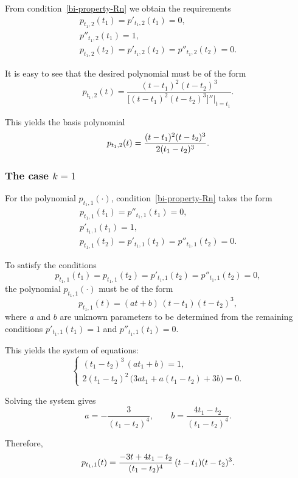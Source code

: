 \documentclass{article}
\theoremstyle{definition}
\theoremstyle{definition}
\numberwithin{figure}{section}
\newcommand{\1}{\mathbf{1}}
\begin{document}
From condition~\eqref{bi-property-Rn} we obtain the requirements
\begin{align*}
    p_{t_1,2}(t_1) = p'_{t_1,2}(t_1) = 0,\\
    p''_{t_1,2}(t_1) = 1,\\
    p_{t_1,2}(t_2) = p'_{t_1,2}(t_2) = p''_{t_1,2}(t_2) = 0.
\end{align*}

It is easy to see that the desired polynomial must be of the form
\[
    p_{t_1,2}(t)
    =
    \frac{(t - t_1)^2 (t - t_2)^3}{\bigl[(t - t_1)^2 (t - t_2)^3\bigr]''\big|_{t = t_1}}.
\]

This yields the basis polynomial
\begin{equation}\label{p_{t_1,2}}
    p_{t_1,2}(t)
    =
    \frac{(t - t_1)^2 (t - t_2)^3}{2 (t_1 - t_2)^3}.
\end{equation}

\subsubsection*{The case $k = 1$}

For the polynomial $p_{t_1,1}(\cdot)$, condition~\eqref{bi-property-Rn} takes the form
\begin{align*}
    p_{t_1,1}(t_1) = p''_{t_1,1}(t_1) = 0,\\
    p'_{t_1,1}(t_1) = 1,\\
    p_{t_1,1}(t_2) = p'_{t_1,1}(t_2) = p''_{t_1,1}(t_2) = 0.
\end{align*}

To satisfy the conditions 
\[
p_{t_1,1}(t_1) = p_{t_1,1}(t_2) = p'_{t_1,1}(t_2) = p''_{t_1,1}(t_2) = 0,
\]
the polynomial $p_{t_1,1}(\cdot)$ must be of the form
\[
    p_{t_1,1}(t) = (a t + b)\,(t - t_1)(t - t_2)^3,
\]
where \(a\) and \(b\) are unknown parameters to be determined from the remaining conditions  
\(p'_{t_1,1}(t_1) = 1\) and \(p''_{t_1,1}(t_1) = 0\).

This yields the system of equations:
\[
\begin{cases}
    (t_1 - t_2)^3\,(a t_1 + b) = 1,\\[4pt]
    2 (t_1 - t_2)^2\,\bigl(3 a t_1 + a(t_1 - t_2) + 3 b \bigr) = 0.
\end{cases}
\]

Solving the system gives
\[
    a = -\dfrac{3}{(t_1 - t_2)^4},
    \qquad
    b = \dfrac{4 t_1 - t_2}{(t_1 - t_2)^4}.
\]

Therefore,
\begin{equation}\label{p_{t_1,1}}
    p_{t_1,1}(t)
    =
    \frac{-3 t + 4 t_1 - t_2}{(t_1 - t_2)^4}\,
    (t - t_1)(t - t_2)^3.
\end{equation}
\end{document}
